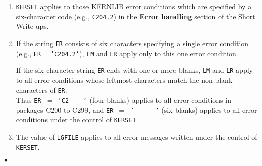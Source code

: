 \newpage
\Notes
\begin{enumerate}
\item {\tt KERSET} applies to those KERNLIB error conditions which are
specified by a six-character code (e.g., {\tt C204.2}) in the
{\bf Error handling} section of the Short Write-ups.
\item If the string {\tt ER} consists of six characters specifying a
single error condition \\
(e.g., {\tt ER}$=${\tt 'C204.2'}), {\tt LM} and
{\tt LR} apply only to this one error condition.
\par
If the six-character string {\tt ER} ends with one or more blanks,
{\tt LM} and {\tt LR} apply to all error conditions whose leftmost
characters match the non-blank characters of {\tt ER}. \\
Thus {\tt ER $=$ 'C2\ \ \ \ '}  (four blanks) applies to all error
conditions in packages C200 to C299, and {\tt ER $=$ '\ \ \ \ \ \ '}
(six blanks) applies to all error conditions under the control of
{\tt KERSET}.
\item The value of {\tt LGFILE} applies to all error messages written
under the control of {\tt KERSET}.
\end{enumerate}
$\bullet$

